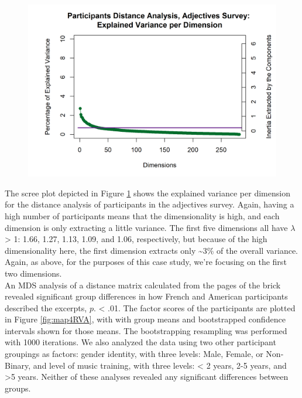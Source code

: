 \documentclass[
  english,
  man,floatsintext]{apa6}
\begin{document}
\begin{figure}  
  \begin{center}
    \includegraphics{./Music-Descriptor-Space_files/figure-latex/a.part.scree-1.png}
  \caption{ }\label{fig:apartscree}  
 \end{center}
\end{figure}

The scree plot depicted in Figure \ref{fig:apartscree} shows the explained variance per dimension for the distance analysis of participants in the adjectives survey. Again, having a high number of participants means that the dimensionality is high, and each dimension is only extracting a little variance. The first five dimensions all have \(\lambda\) \textgreater{} 1: 1.66, 1.27, 1.13, 1.09, and 1.06, respectively, but because of the high dimensionality here, the first dimension extracts only \textasciitilde3\% of the overall variance. Again, as above, for the purposes of this case study, we're focusing on the first two dimensions.\\
An MDS analysis of a distance matrix calculated from the pages of the brick revealed significant group differences in how French and American participants described the excerpts, \(\textit{p}\). \textless{} .01. The factor scores of the participants are plotted in Figure \ref{fig:map4RVA}, with with group means and bootstrapped confidence intervals shown for those means. The bootstrapping resampling was performed with 1000 iterations. We also analyzed the data using two other participant groupings as factors: gender identity, with three levels: Male, Female, or Non-Binary, and level of music training, with three levels: \textless{} 2 years, 2-5 years, and \textgreater5 years. Neither of these analyses revealed any significant differences between groups.
\end{document}
